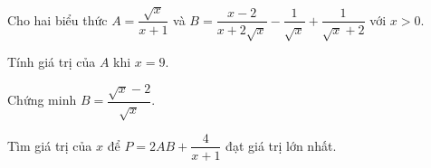 
\begin{bt}
Cho hai biểu thức $A = \dfrac{\sqrt{x}}{x+1}$ và $B = \dfrac{x-2}{x+2\sqrt{x}} - \dfrac{1}{\sqrt{x}} + \dfrac{1}{\sqrt{x}+2}$ với $x > 0$.
\begin{cacy}
\item Tính giá trị của $A$ khi $x = 9$.
\item Chứng minh $B = \dfrac{\sqrt{x}-2}{\sqrt{x}}$.
\item Tìm giá trị của $x$ để $P = 2AB + \dfrac{4}{x+1}$ đạt giá trị lớn nhất.
\end{cacy}
\loigiai{}
\end{bt}
